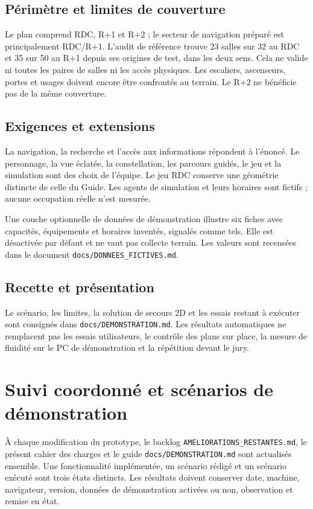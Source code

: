 \documentclass[11pt,a4paper]{article}
\begin{document}
\subsection{Périmètre et limites de couverture}
Le plan comprend RDC, R+1 et R+2 ; le secteur de navigation préparé est principalement RDC/R+1. L'audit de référence trouve 23 salles sur 32 au RDC et 35 sur 50 au R+1 depuis ses origines de test, dans les deux sens. Cela ne valide ni toutes les paires de salles ni les accès physiques. Les escaliers, ascenseurs, portes et usages doivent encore être confrontés au terrain. Le R+2 ne bénéficie pas de la même couverture.

\subsection{Exigences et extensions}
La navigation, la recherche et l'accès aux informations répondent à l'énoncé. Le personnage, la vue éclatée, la constellation, les parcours guidés, le jeu et la simulation sont des choix de l'équipe. Le jeu RDC conserve une géométrie distincte de celle du Guide. Les agents de simulation et leurs horaires sont fictifs ; aucune occupation réelle n'est mesurée.

Une couche optionnelle de données de démonstration illustre six fiches avec capacités, équipements et horaires inventés, signalés comme tels. Elle est désactivée par défaut et ne vaut pas collecte terrain. Les valeurs sont recensées dans le document \texttt{docs/DONNEES\_FICTIVES.md}.

\subsection{Recette et présentation}
Le scénario, les limites, la solution de secours 2D et les essais restant à exécuter sont consignés dans \texttt{docs/DEMONSTRATION.md}. Les résultats automatiques ne remplacent pas les essais utilisateurs, le contrôle des plans sur place, la mesure de fluidité sur le PC de démonstration et la répétition devant le jury.


\section{Suivi coordonné et scénarios de démonstration}
À chaque modification du prototype, le backlog \texttt{AMELIORATIONS\_RESTANTES.md}, le présent cahier des charges et le guide \texttt{docs/DEMONSTRATION.md} sont actualisés ensemble. Une fonctionnalité implémentée, un scénario rédigé et un scénario exécuté sont trois états distincts. Les résultats doivent conserver date, machine, navigateur, version, données de démonstration activées ou non, observation et remise en état.
\end{document}
